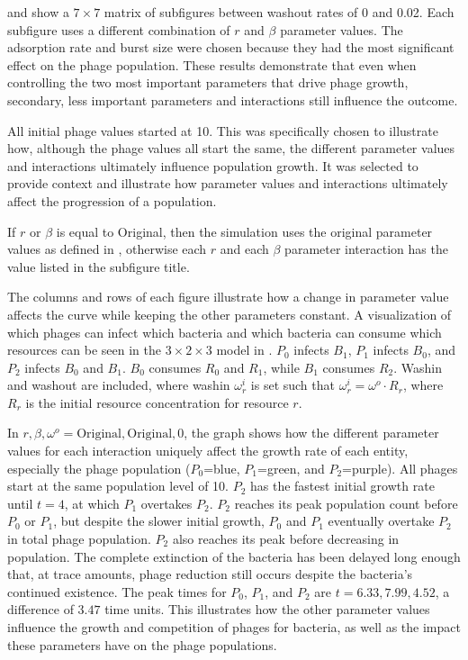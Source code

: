  and  show a $7\times7$ matrix of subfigures between washout rates of 0 and 0.02. 
Each subfigure uses a different combination of $r$ and $\beta$ parameter values. 
The adsorption rate and burst size were chosen because they had the most significant effect on the phage population. 
These results demonstrate that even when controlling the two most important parameters that drive phage growth, secondary, less important parameters and interactions still influence the outcome. 

All initial phage values started at 10. 
This was specifically chosen to illustrate how, although the phage values all start the same, the different parameter values and interactions ultimately influence population growth. 
It was selected to provide context and illustrate how parameter values and interactions ultimately affect the progression of a population. 

If $r$ or $\beta$ is equal to Original, then the simulation uses the original parameter values as defined in , otherwise each $r$ and each $\beta$ parameter interaction has the value listed in the subfigure title. 

The columns and rows of each figure illustrate how a change in parameter value affects the curve while keeping the other parameters constant. 
A visualization of which phages can infect which bacteria and which bacteria can consume which resources can be seen in the $3 \times 2\times 3$ model in . 
$P_0$ infects $B_1$, $P_1$ infects $B_0$, and $P_2$ infects $B_0$ and $B_1$. 
$B_0$ consumes $R_0$ and $R_1$, while $B_1$ consumes $R_2$. 
Washin and washout are included, where washin $\omega^i_r$ is set such that $\omega^i_r = \omega^o \cdot R_r$, where $R_r$ is the initial resource concentration for resource $r$. 

In $r, \beta, \omega^o=\text{Original}, \text{Original}, 0$, the graph shows how the different parameter values for each interaction uniquely affect the growth rate of each entity, especially the phage population ($P_0$=blue, $P_1$=green, and $P_2$=purple). 
All phages start at the same population level of 10. 
$P_2$ has the fastest initial growth rate until $t=4$, at which $P_1$ overtakes $P_2$. 
$P_2$ reaches its peak population count before $P_0$ or $P_1$, but despite the slower initial growth, $P_0$ and $P_1$ eventually overtake $P_2$ in total phage population. 
$P_2$ also reaches its peak before decreasing in population. 
The complete extinction of the bacteria has been delayed long enough that, at trace amounts, phage reduction still occurs despite the bacteria’s continued existence. 
The peak times for $P_0$, $P_1$, and $P_2$ are $t=6.33, 7.99, 4.52$, a difference of $3.47$ time units. 
This illustrates how the other parameter values influence the growth and competition of phages for bacteria, as well as the impact these parameters have on the phage populations. 

